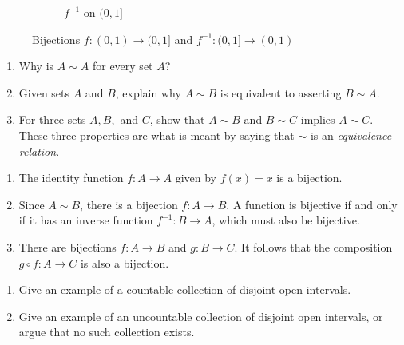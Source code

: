 \documentclass{lew98_solutions}
\begin{document}
\begin{solution}
\begin{enumerate}
\begin{figure}[H]
\begin{subfigure}{0.49\textwidth}
                \caption{\( f^{-1} \) on \( (0, 1] \)}
            \end{subfigure}
            \caption{Bijections \( f : (0, 1) \to (0, 1] \) and \( f^{-1} : (0, 1] \to (0, 1) \)}
            \label{fig:ex1.5.4_3}
        \end{figure}
    \end{enumerate}
\end{solution}

\begin{exercise}
\label{ex:1.5.5}
    \begin{enumerate}
        \item Why is \( A \sim A \) for every set \( A \)?

        \item Given sets \( A \) and \( B \), explain why \( A \sim B \) is equivalent to asserting \( B \sim A \).

        \item For three sets \( A, B, \) and \( C \), show that \( A \sim B \) and \( B \sim C \) implies \( A \sim C \). These three properties are what is meant by saying that \( \sim \) is an \textit{equivalence relation}.
    \end{enumerate}
\end{exercise}

\begin{solution}
    \begin{enumerate}
        \item The identity function \( f : A \to A \) given by \( f(x) = x \) is a bijection.

        \item Since \( A \sim B \), there is a bijection \( f : A \to B \). A function is bijective if and only if it has an inverse function \( f^{-1} : B \to A \), which must also be bijective.

        \item There are bijections \( f : A \to B \) and \( g : B \to C \). It follows that the composition \( g \circ f : A \to C \) is also a bijection.
    \end{enumerate}
\end{solution}

\begin{exercise}
\label{ex:1.5.6}
    \begin{enumerate}
        \item Give an example of a countable collection of disjoint open intervals.

        \item Give an example of an uncountable collection of disjoint open intervals, or argue that no such collection exists.
    \end{enumerate}
\end{exercise}
\end{document}
